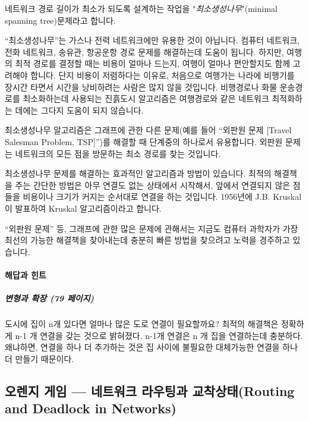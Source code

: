 \documentclass[]{article}
\begin{document}
네트워크 경로 길이가 최소가 되도록 설계하는 작업을
"\emph{최소생성나무}"(minimal spanning tree)문제라고 합니다.

``최소생성나무''는 가스나 전력 네트워크에만 유용한 것이 아닙니다. 컴퓨터
네트워크, 전화 네트워크, 송유관, 항공운항 경로 문제를 해결하는데 도움이
됩니다. 하지만, 여행의 최적 경로를 결정할 때는 비용이 얼마나 드는지,
여행이 얼마나 편안할지도 함께 고려해야 합니다. 단지 비용이 저렴하다는
이유로, 처음으로 여행가는 나라에 비행기를 장시간 타면서 시간을
낭비하려는 사람은 많지 않을 것입니다. 비행경로나 화물 운송경로를
최소화하는데 사용되는 진흙도시 알고리즘은 여행경로와 같은 네트워크
최적화하는 데에는 그다지 도움이 되지 않습니다.

최소생성나무 알고리즘은 그래프에 관한 다른 문제(예를 들어 ``외판원 문제
{[}Travel Salesman Problem, TSP{]}'')를 해결할 때 단계중의 하나로서
유용합니다. 외판원 문제는 네트워크의 모든 점을 방문하는 최소 경로를 찾는
것입니다.

최소생성나무 문제를 해결하는 효과적인 알고리즘과 방법이 있습니다. 최적의
해결책을 주는 간단한 방법은 아무 연결도 없는 상태에서 시작해서, 앞에서
연결되지 않은 점들을 비용이나 크기가 커지는 순서대로 연결을 하는
것입니다. 1956년에 J.B. Kruskal이 발표하여 Kruskal 알고리즘이라고
합니다.

``외판원 문제'' 등, 그래프에 관한 많은 문제에 관해서는 지금도 컴퓨터
과학자가 가장 최선의 가능한 해결책을 찾아내는데 충분히 빠른 방법을
찾으려고 노력을 경주하고 있습니다.

\mbox{}\paragraph{해답과 힌트}\label{section-132}

\subparagraph{변형과 확장 (79 페이지)}\label{section-133}

도시에 집이 n개 있다면 얼마나 많은 도로 연결이 필요할까요? 최적의
해결책은 정확하게 n-1 개 연결을 갖는 것으로 밝혀졌다. n-1개 연결은 n 개
집을 연결하는데 충분하다. 왜냐하면, 연결을 하나 더 추가하는 것은 집
사이에 불필요한 대체가능한 연결을 하나 더 만들기 때문이다.

\subsection{오렌지 게임 --- 네트워크 라우팅과 교착상태(Routing and
Deadlock in Networks)}\label{mdash---routing-and-deadlock-in-networks}
\end{document}

